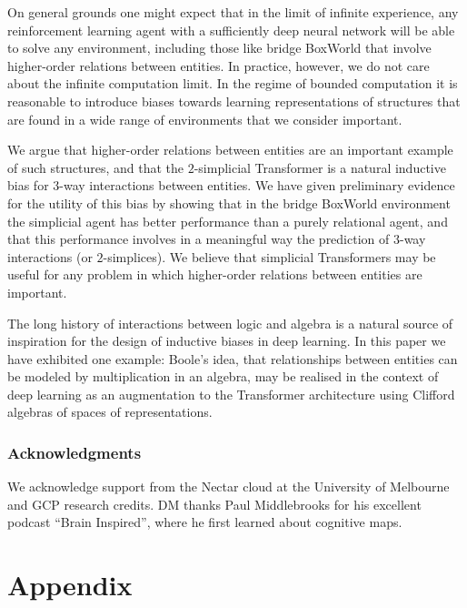 \documentclass{article} %
\begin{document}
On general grounds one might expect that in the limit of infinite experience, any reinforcement learning agent with a sufficiently deep neural network will be able to solve any environment, including those like bridge BoxWorld that involve higher-order relations between entities. In practice, however, we do not care about the infinite computation limit. In the regime of bounded computation it is reasonable to introduce biases towards learning representations of structures that are found in a wide range of environments that we consider important.

We argue that higher-order relations between entities are an important example of such structures, and that the $2$-simplicial Transformer is a natural inductive bias for $3$-way interactions between entities. We have given preliminary evidence for the utility of this bias by showing that in the bridge BoxWorld environment the simplicial agent has better performance than a purely relational agent, and that this performance involves in a meaningful way the prediction of $3$-way interactions (or $2$-simplices). We believe that simplicial Transformers may be useful for any problem in which higher-order relations between entities are important.

The long history of interactions between logic and algebra is a natural source of inspiration for the design of inductive biases in deep learning. In this paper we have exhibited one example: Boole's idea, that relationships between entities can be modeled by multiplication in an algebra, may be realised in the context of deep learning as an augmentation to the Transformer architecture using Clifford algebras of spaces of representations.








\newpage


\subsubsection*{Acknowledgments}
We acknowledge support from the Nectar cloud at the University of Melbourne and GCP research credits. DM thanks Paul Middlebrooks for his excellent podcast ``Brain Inspired'', where he first learned about cognitive maps.




\appendix
\section*{Appendix}
\end{document}
